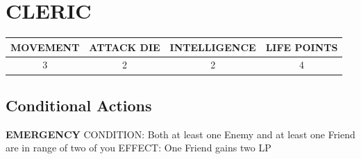 \documentclass[a4paper,12pt]{article}
\begin{document}

\section*{CLERIC}
\begin{tabular}{c|c|c|c}
	\uppercase{Movement} & \uppercase{Attack Die} & \uppercase{Intelligence} & \uppercase{Life points} \\
	\hline
	3 & 2 & 2 & 4 \\
\end{tabular}
\subsection*{Conditional Actions}

\uppercase{\textbf{Emergency}} \newline \uppercase{Condition:} Both at least one Enemy and at least one Friend are in range of two of you \newline \uppercase{Effect:} One Friend gains two LP
\end{document}
